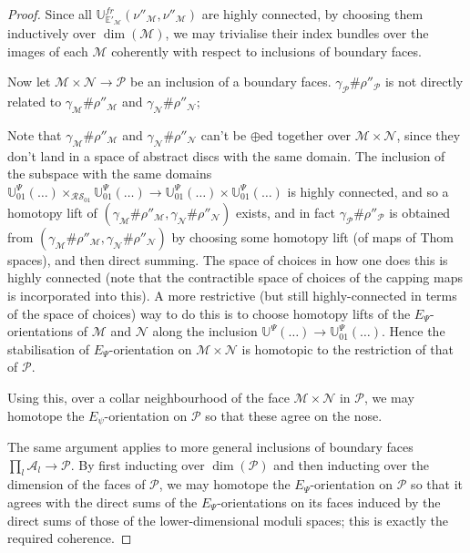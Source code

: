 \documentclass{TPmod}
\def\bE{\mathbb{E}}
\def\bU{\mathbb{U}}
\newcommand{\cA}{\mathcal{A}}
\newcommand{\cM}{\mathcal{M}}
\newcommand{\cN}{\mathcal{N}}
\newcommand{\cP}{\mathcal{P}}
\newcommand{\cR}{\mathcal{R}}
\newcommand{\cS}{\mathcal{S}}
\numberwithin{equation}{section}
\begin{document}
\begin{proof}
        Since all $\bU^{fr}_{\bE'_\cM}(\nu''_\cM, \nu''_\cM)$ are highly connected, by choosing them inductively over $\dim(\cM)$, we may trivialise their index bundles over the images of each $\cM$ coherently with respect to inclusions of boundary faces.

        Now let $\cM \times \cN \to \cP$ be an inclusion of a boundary faces. $\gamma_\cP \# \rho''_\cP$ is not directly related to $\gamma_\cM \# \rho''_\cM$ and $\gamma_\cN \# \rho''_\cN$; 
        
        Note that $\gamma_\cM \# \rho''_\cM$ and $\gamma_\cN \# \rho''_\cN$ can't be $\oplus$ed together over $\cM \times \cN$, since they don't land in a space of abstract discs with the same domain. The inclusion of the subspace with the same domains $\bU^\Psi_{01}(\ldots) \times_{\cR\cS_{01}} \bU^\Psi_{01}(\ldots ) \to \bU^\Psi_{01}(\ldots) \times \bU^\Psi_{01}(\ldots)$ is highly connected, and so a homotopy lift of $(\gamma_\cM \# \rho''_\cM, \gamma_\cN \# \rho''_\cN)$ exists, and in fact $\gamma_\cP \# \rho''_\cP$ is obtained from $(\gamma_\cM \# \rho''_\cM, \gamma_\cN \# \rho''_\cN)$ by choosing some homotopy lift (of maps of Thom spaces), and then direct summing. The space of choices in how one does this is highly connected (note that the contractible space of choices of the capping maps is incorporated into this). A more restrictive (but still highly-connected in terms of the space of choices) way to do this is to choose homotopy lifts of the $E_\Psi$-orientations of $\cM$ and $\cN$ along the inclusion $\bU^\Psi(\ldots) \to \bU^\Psi_{01}(\ldots)$. Hence the stabilisation of $E_\Psi$-orientation on $\cM \times \cN$ is homotopic to the restriction of that of $\cP$.
        
        Using this, over a collar neighbourhood of the face $\cM \times \cN$ in $\cP$, we may homotope the $E_\psi$-orientation on $\cP$ so that these agree on the nose.

        The same argument applies to more general inclusions of boundary faces $\prod_l \cA_l \to \cP$. By first inducting over $\dim(\cP)$ and then inducting over the dimension of the faces of $\cP$, we may homotope the $E_\Psi$-orientation on $\cP$ so that it agrees with the direct sums of the $E_\Psi$-orientations on its faces induced by the direct sums of those of the lower-dimensional moduli spaces; this is exactly the required coherence.

\end{proof}
\end{document}
